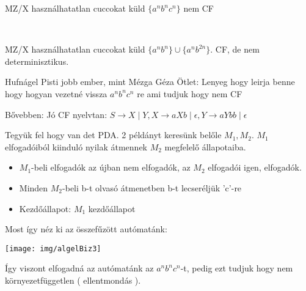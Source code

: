 	\begin{tetel}{MZ/X használhatatlan cuccokat küld}
   \textbf{$\lbrace a^n b^n c^n \rbrace $} nem CF
\end{tetel}

  		\notBiz \\[0pt]

	\begin{tetel}{MZ/X használhatatlan cuccokat küld}
   $\lbrace a^n b^n \rbrace \cup \lbrace a^n b^{2n} \rbrace $. CF, de nem determinisztikus.
   \end{tetel}

\begin{bizonyitas}{Hufnágel Pisti jobb ember, mint Mézga Géza}
 Ötlet: Lenyeg hogy leirja benne hogy hogyan vezetné vissza $a^n b^n c^n$ re ami tudjuk hogy nem CF

  		Bővebben: Jó CF nyelvtan: $S \rightarrow X \mid Y , X \rightarrow aXb \mid \epsilon , Y \rightarrow aYbb \mid \epsilon $

  		Tegyük fel hogy van det PDA. 2 példányt keresünk belőle $M_1, M_2$. $M_1$ elfogadóiból kiinduló nyilak átmennek $M_2$ megfelelő állapotaiba.
  		\begin{itemize}[itemsep=0 mm]
  			\item $M_1$-beli elfogadók az újban nem elfogadók, az $M_2$ elfogadói igen, elfogadók.
  			\item Minden $M_2$-beli b-t olvasó átmenetben b-t lecseréljük 'c'-re
  			\item Kezdőállapot: $M_1$ kezdőállapot
  		\end{itemize}
  		Most így néz ki az összefűzött autómatánk:

  \begin{center}
  	 \texttt{[image: img/algelBiz3]}
  \end{center}

	Így viszont elfogadná az autómatánk az $a^nb^nc^n$-t, pedig ezt tudjuk hogy nem környezetfüggetlen ( ellentmondás ).
\end{bizonyitas}

